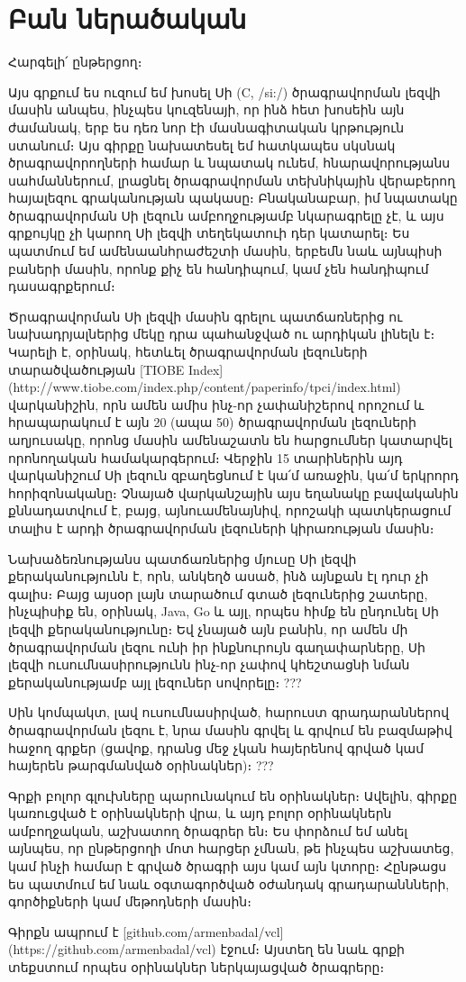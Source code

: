 \chapter*{Բան ներածական}

Հարգելի՛ ընթերցող։

Այս գրքում ես ուզում եմ խոսել Սի (C, /si:/) ծրագրավորման լեզվի մասին անպես, ինչպես կուզենայի, որ ինձ հետ խոսեին այն ժամանակ, երբ ես դեռ նոր էի մասնագիտական կրթություն ստանում։ Այս գիրքը նախատեսել եմ հատկապես սկսնակ ծրագրավորողների համար և նպատակ ունեմ, հնարավորությանս սահմաններում, լրացնել ծրագրավորման տեխնիկային վերաբերող հայալեզու գրականության պակասը։ Բնականաբար, իմ նպատակը ծրագրավորման Սի լեզուն ամբողջությամբ նկարագրելը չէ, և այս գրքույկը չի կարող Սի լեզվի տեղեկատուի դեր կատարել։ Ես պատմում եմ ամենաանհրաժեշտի մասին, երբեմն նաև այնպիսի բաների մասին, որոնք քիչ են հանդիպում, կամ չեն հանդիպում դասագրքերում։

Ծրագրավորման Սի լեզվի մասին գրելու պատճառներից ու նախադրյալներից մեկը դրա պահանջված ու արդիկան լինելն է։ Կարելի է, օրինակ, հետևել ծրագրավորման լեզուների տարածվածության [TIOBE Index](http://www.tiobe.com/index.php/content/paperinfo/tpci/index.html) վարկանիշին, որն ամեն ամիս ինչ-որ չափանիշերով որոշում և հրապարակում է այն 20 (ապա 50) ծրագրավորման լեզուների աղյուսակը, որոնց մասին ամենաշատն են հարցումներ կատարվել որոնողական համակարգերում։ Վերջին 15 տարիներին այդ վարկանիշում Սի լեզուն զբաղեցնում է կա՛մ առաջին, կա՛մ երկրորդ հորիզոնականը։ Չնայած վարկանշային այս եղանակը բավականին քննադատվում է, բայց, այնուամենայնիվ, որոշակի պատկերացում տալիս է արդի ծրագրավորման լեզուների կիրառության մասին։

Նախաձեռնությանս պատճառներից մյուսը Սի լեզվի քերականությունն է, որն, անկեղծ ասած, ինձ այնքան էլ դուր չի գալիս։ Բայց այսօր լայն տարածում գտած լեզուներից շատերը, ինչպիսիք են, օրինակ, Java, Go և այլ, որպես հիմք են ընդունել Սի լեզվի քերականությունը։ Եվ չնայած այն բանին, որ ամեն մի ծրագրավորման լեզու ունի իր ինքնուրույն գաղափարները, Սի լեզվի ուսումնասիրությունն ինչ-որ չափով կհեշտացնի նման քերականությամբ այլ լեզուներ սովորելը։ ???

Սին կոմպակտ, լավ ուսումնասիրված, հարուստ գրադարաններով ծրագրավորման լեզու է, նրա մասին գրվել և գրվում են բազմաթիվ հաջող գրքեր (ցավոք, դրանց մեջ չկան հայերենով գրված կամ հայերեն թարգմանված օրինակներ)։ ???

Գրքի բոլոր գլուխները պարունակում են օրինակներ։ Ավելին, գիրքը կառուցված է օրինակների վրա, և այդ բոլոր օրինակներն ամբողջական, աշխատող ծրագրեր են։ Ես փորձում եմ անել այնպես, որ ընթերցողի մոտ հարցեր չմնան, թե ինչպես աշխատեց, կամ ինչի համար է գրված ծրագրի այս կամ այն կտորը։ Հընթացս ես պատմում եմ նաև օգտագործված օժանդակ գրադարաննների, գործիքների կամ մեթոդների մասին։

Գիրքն ապրում է [github.com/armenbadal/vcl](https://github.com/armenbadal/vcl) էջում։ Այստեղ են նաև գրքի տեքստում որպես օրինակներ ներկայացված ծրագրերը։
